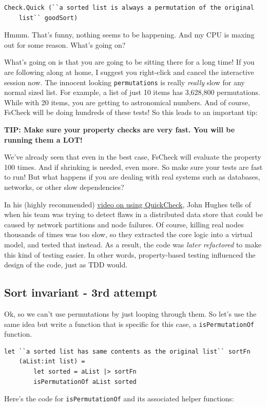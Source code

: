 \begin{verbatim}
Check.Quick (``a sorted list is always a permutation of the original 
    list`` goodSort)
\end{verbatim}
Hmmm. That's funny, nothing seems to be happening. And my CPU is maxing
out for some reason. What's going on?

What's going on is that you are going to be sitting there for a long
time! If you are following along at home, I suggest you right-click and
cancel the interactive session now.
The innocent looking \texttt{permutations} is really \emph{really} slow
for any normal sized list. For example, a list of just 10 items has
3,628,800 permutations. While with 20 items, you are getting to
astronomical numbers.
And of course, FsCheck will be doing hundreds of these tests! So this
leads to an important tip:

\textbf{TIP: Make sure your property checks are very fast. You will be
running them a LOT!}

We've already seen that even in the best case, FsCheck will evaluate the
property 100 times. And if shrinking is needed, even more. So make sure
your tests are fast to run!
But what happens if you are dealing with real systems such as databases,
networks, or other slow dependencies?

In his (highly recommended) \href{http://vimeo.com/68383317}{video on
using QuickCheck}, John Hughes tells of when his team was trying to
detect flaws in a distributed data store that could be caused by network
partitions and node failures.
Of course, killing real nodes thousands of times was too slow, so they
extracted the core logic into a virtual model, and tested that instead.
As a result, the code was \emph{later refactored} to make this kind of
testing easier. In other words, property-based testing influenced the
design of the code, just as TDD would.

\subsection{Sort invariant - 3rd
attempt}
\label{sort-invariant---3rd-attempt}

Ok, so we can't use permutations by just looping through them. So let's
use the same idea but write a function that is specific for this case, a
\texttt{isPermutationOf} function.

\begin{verbatim}
let ``a sorted list has same contents as the original list`` sortFn 
    (aList:int list) = 
        let sorted = aList |> sortFn 
        isPermutationOf aList sorted
\end{verbatim}
Here's the code for \texttt{isPermutationOf} and its associated helper
functions:

